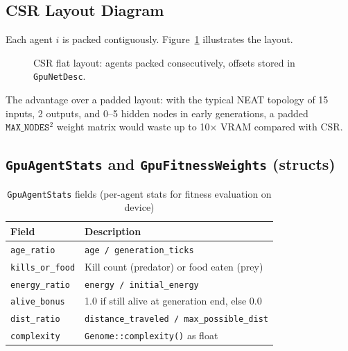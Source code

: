 \subsection{CSR Layout Diagram}

Each agent $i$ is packed contiguously.  Figure~\ref{fig:csr} illustrates the layout.

\begin{figure}[H]
\centering
\scriptsize
{}
\caption{CSR flat layout: agents packed consecutively, offsets stored in
\texttt{GpuNetDesc}.}
\label{fig:csr}
\end{figure}

The advantage over a padded layout: with the typical NEAT topology of 15 inputs, 2
outputs, and 0–5 hidden nodes in early generations, a padded
$\texttt{MAX\_NODES}^2$ weight matrix would waste up to 10× VRAM compared with CSR.

\subsection{\texttt{GpuAgentStats} and \texttt{GpuFitnessWeights} (structs)}

\begin{table}[H]
\centering\small
\caption{\texttt{GpuAgentStats} fields (per-agent stats for fitness evaluation on device)}
\begin{tabularx}{\textwidth}{@{}lX@{}}
\toprule
\textbf{Field} & \textbf{Description} \\
\midrule
\texttt{age\_ratio}      & \texttt{age / generation\_ticks} \\
\texttt{kills\_or\_food} & Kill count (predator) or food eaten (prey) \\
\texttt{energy\_ratio}   & \texttt{energy / initial\_energy} \\
\texttt{alive\_bonus}    & 1.0 if still alive at generation end, else 0.0 \\
\texttt{dist\_ratio}     & \texttt{distance\_traveled / max\_possible\_dist} \\
\texttt{complexity}      & \texttt{Genome::complexity()} as float \\
\bottomrule
\end{tabularx}
\end{table}

